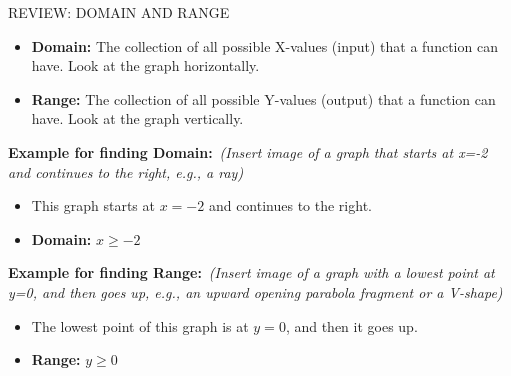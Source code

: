 \documentclass[aspectratio=169]{beamer}
\begin{document}
\begin{frame}{REVIEW: DOMAIN AND RANGE}
    \begin{tcolorbox}[colback=lightgray,colframe=primary,title=Definitions]
        \footnotesize
        \begin{itemize}
            \item \textbf{Domain:} The collection of all possible X-values (input) that a function can have. Look at the graph horizontally.
            \item \textbf{Range:} The collection of all possible Y-values (output) that a function can have. Look at the graph vertically.
        \end{itemize}
        
        \textbf{Example for finding Domain:}\
        \textit{(Insert image of a graph that starts at x=-2 and continues to the right, e.g., a ray)}\
        \begin{itemize}
            \item This graph starts at $x=-2$ and continues to the right.
            \item \textbf{Domain:} $x \ge -2$
        \end{itemize}
        
        \textbf{Example for finding Range:}\
        \textit{(Insert image of a graph with a lowest point at y=0, and then goes up, e.g., an upward opening parabola fragment or a V-shape)}\
        \begin{itemize}
            \item The lowest point of this graph is at $y=0$, and then it goes up.
            \item \textbf{Range:} $y \ge 0$
        \end{itemize}
    \end{tcolorbox}
\end{frame}
\end{document}
